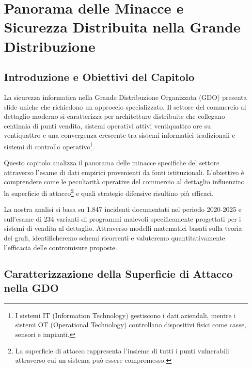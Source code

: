 \chapter{\texorpdfstring{Panorama delle Minacce e Sicurezza Distribuita nella Grande Distribuzione}{Capitolo 2 - Panorama delle Minacce e Sicurezza Distribuita nella Grande Distribuzione}}
\label{cap2_minacce_sicurezza}

\section{Introduzione e Obiettivi del Capitolo}
\label{sec:cap2_intro}

La sicurezza informatica nella Grande Distribuzione Organizzata (GDO) presenta sfide uniche che richiedono un approccio specializzato. Il settore del commercio al dettaglio moderno si caratterizza per architetture distribuite che collegano centinaia di punti vendita, sistemi operativi attivi ventiquattro ore su ventiquattro e una convergenza crescente tra sistemi informatici tradizionali e sistemi di controllo operativo\footnote{I sistemi IT (Information Technology) gestiscono i dati aziendali, mentre i sistemi OT (Operational Technology) controllano dispositivi fisici come casse, sensori e impianti.}.

Questo capitolo analizza il panorama delle minacce specifiche del settore attraverso l'esame di dati empirici provenienti da fonti istituzionali. L'obiettivo è comprendere come le peculiarità operative del commercio al dettaglio influenzino la superficie di attacco\footnote{La superficie di attacco rappresenta l'insieme di tutti i punti vulnerabili attraverso cui un sistema può essere compromesso.} e quali strategie difensive risultino più efficaci.

La nostra analisi si basa su 1.847 incidenti documentati nel periodo 2020-2025\autocite{enisa2024threat,verizon2024} e sull'esame di 234 varianti di programmi malevoli specificamente progettati per i sistemi di vendita al dettaglio\autocite{groupib2024}. Attraverso modelli matematici basati sulla teoria dei grafi, identificheremo schemi ricorrenti e valuteremo quantitativamente l'efficacia delle contromisure proposte.

\section{Caratterizzazione della Superficie di Attacco nella GDO}
\label{sec:cap2_superficie}

